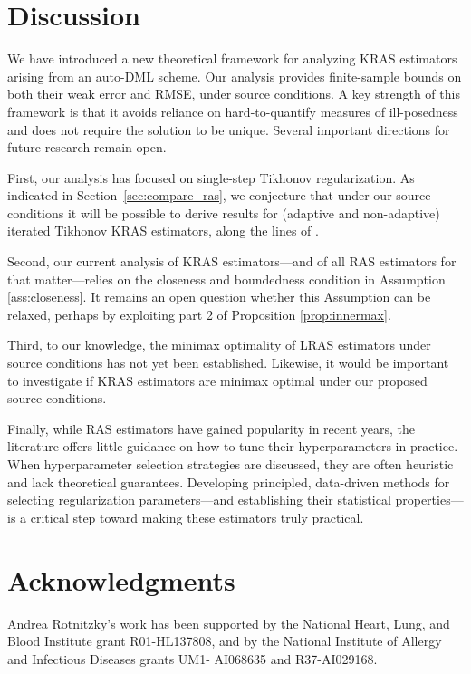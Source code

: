 \documentclass[twoside,11pt]{article}
\begin{document}
\section{Discussion}\label{sec:conclusions}

We have introduced a new theoretical framework for analyzing KRAS estimators arising from an auto-DML scheme. Our analysis provides finite-sample bounds on both their weak error and RMSE, under source conditions. A key strength of this framework is that it avoids reliance on hard-to-quantify measures of ill-posedness and does not require the solution to be unique. 
Several important directions for future research remain open. 

First, our analysis has focused on single-step Tikhonov regularization. As indicated in Section~\ref{sec:compare_ras}, we conjecture that under our source conditions it will be possible to derive results for (adaptive and non-adaptive) iterated Tikhonov KRAS estimators, along the lines of \citet{bennett2023source}.

Second, our current analysis of KRAS estimators---and of all RAS estimators for that matter---relies on the closeness and boundedness condition in Assumption \ref{ass:closeness}. It remains an open question whether this Assumption can be relaxed, perhaps by exploiting part 2 of Proposition \ref{prop:innermax}.

Third, to our knowledge, the minimax optimality of LRAS estimators under source conditions has not yet been established. Likewise, it would be important to investigate if KRAS estimators are minimax optimal under our proposed source conditions.


Finally, while RAS estimators have gained popularity in recent years, the literature offers little guidance on how to tune their hyperparameters in practice. When hyperparameter selection strategies are discussed, they are often heuristic and lack theoretical guarantees. Developing principled, data-driven methods for selecting regularization parameters---and establishing their statistical properties---is a critical step toward making these estimators truly practical.

\section*{Acknowledgments}
Andrea Rotnitzky’s work has been supported by the National Heart, Lung, and Blood Institute grant R01-HL137808, and by the National Institute of Allergy and Infectious Diseases grants UM1- AI068635 and R37-AI029168.
\end{document}
